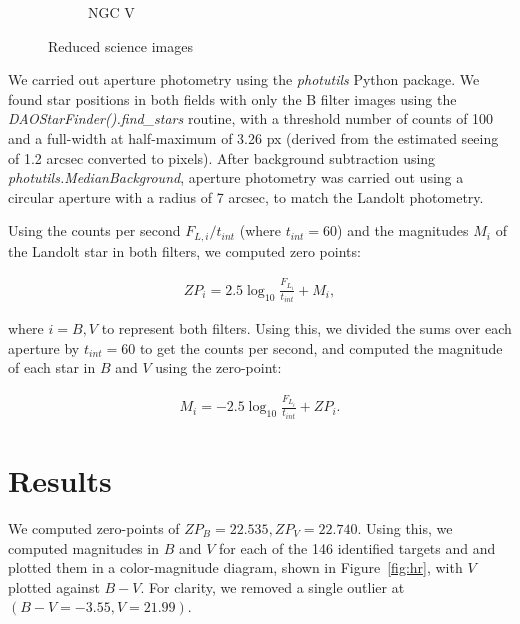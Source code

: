 \documentclass{article}
\begin{document}
\begin{figure}
\begin{subfigure}[b]{0.475\textwidth}
            \caption[]%
            {{\small NGC V}}    
            \label{fig:ngcV}
        \end{subfigure}
        \caption[ The four reduced science images ]
        {\small Reduced science images} 
        \label{fig:sci}
    \end{figure}

    We carried out aperture photometry using the \textit{photutils} Python package. We found star positions in both fields with only the B filter images using the \textit{DAOStarFinder().find\_stars} routine, with a threshold number of counts of 100 and a full-width at half-maximum of 3.26 px (derived from the estimated seeing of 1.2 arcsec converted to pixels). After background subtraction using \textit{photutils.MedianBackground}, aperture photometry was carried out using a circular aperture with a radius of 7 arcsec, to match the Landolt photometry.

    Using the counts per second $F_{L,i}/t_{int}$ (where $t_{int} = 60$) and the magnitudes $M_i$ of the Landolt star in both filters, we computed zero points:

    \begin{align}
        ZP_i = 2.5 \log_{10} \frac{F_{L_i}}{t_{int}} + M_i,
    \end{align}

    where $i = B, V$ to represent both filters. Using this, we divided the sums over each aperture by $t_{int}=60$ to get the counts per second, and computed the magnitude of each star in $B$ and $V$ using the zero-point:

    \begin{align}
        M_i = -2.5 \log_{10} \frac{F_{L_i}}{t_{int}} + ZP_i.
    \end{align}

    \section{Results}

    We computed zero-points of $ZP_B = 22.535, ZP_V = 22.740$. Using this, we computed magnitudes in $B$ and $V$ for each of the 146 identified targets and and plotted them in a color-magnitude diagram, shown in Figure~\ref{fig:hr}, with $V$ plotted against $B - V$. For clarity, we removed a single outlier at $(B - V = -3.55, V = 21.99)$.
\end{document}
